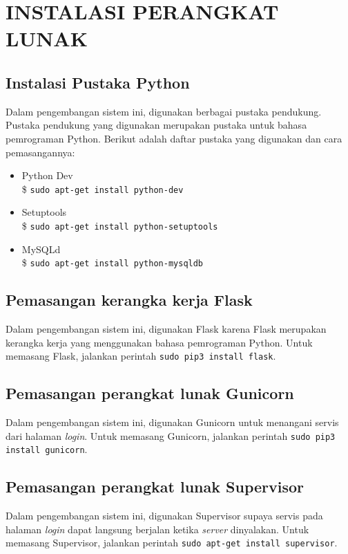 \chapter{INSTALASI PERANGKAT LUNAK}

\section*{Instalasi Pustaka Python} \label{install:pythonlibrary}
	Dalam pengembangan sistem ini, digunakan berbagai pustaka pendukung. Pustaka pendukung yang digunakan merupakan pustaka untuk bahasa pemrograman Python. Berikut adalah daftar pustaka yang digunakan dan cara pemasangannya:
    \begin{itemize}
    \item Python Dev \\
    	\$ \texttt{sudo apt-get install python-dev}
    \item Setuptools \\
    	\$ \texttt{sudo apt-get install python-setuptools}
    \item MySQLd \\
    	\$ \texttt{sudo apt-get install python-mysqldb}
    \end{itemize}
	
\section*{Pemasangan kerangka kerja Flask}
Dalam pengembangan sistem ini, digunakan Flask karena Flask merupakan kerangka kerja yang menggunakan bahasa pemrograman Python. Untuk memasang Flask, jalankan perintah \texttt{sudo pip3 install flask}.

\section*{Pemasangan perangkat lunak Gunicorn}
Dalam pengembangan sistem ini, digunakan Gunicorn untuk menangani servis dari halaman \textit{login}. Untuk memasang Gunicorn, jalankan perintah \texttt{sudo pip3 install gunicorn}.

\section*{Pemasangan perangkat lunak Supervisor}
Dalam pengembangan sistem ini, digunakan Supervisor supaya servis pada halaman \textit{login} dapat langsung berjalan ketika \textit{server} dinyalakan. Untuk memasang Supervisor, jalankan perintah \texttt{sudo apt-get install supervisor}.

